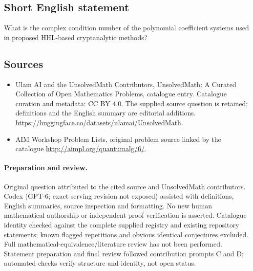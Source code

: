\documentclass[11pt]{article}
\begin{document}
\subsection{Short English statement}
What is the complex condition number of the polynomial coefficient systems used in proposed HHL-based cryptanalytic methods?
\subsection{Sources}
\begin{itemize}
\item[\hypertarget{source:statement:1}{S1}] Ulam AI and the UnsolvedMath Contributors, UnsolvedMath: A Curated Collection of Open Mathematics Problems, catalogue entry. Catalogue curation and metadata: CC BY 4.0. The supplied source question is retained; definitions and the English summary are editorial additions.
\url{https://huggingface.co/datasets/ulamai/UnsolvedMath}.
\item[\hypertarget{source:statement:2}{S2}] AIM Workshop Problem Lists, original problem source linked by the catalogue
\url{http://aimpl.org/quantumalg/6/}.
\end{itemize}
\paragraph{Preparation and review.}
Original question attributed to the cited source and UnsolvedMath contributors. Codex (GPT-6; exact serving revision not exposed) assisted with definitions, English summaries, source inspection and formatting. No new human mathematical authorship or independent proof verification is asserted. Catalogue identity checked against the complete supplied registry and existing repository statements; known flagged repetitions and obvious identical conjectures excluded. Full mathematical-equivalence/literature review has not been performed. Statement preparation and final review followed contribution prompts C and D; automated checks verify structure and identity, not open status.
\label{end:statement}
\end{document}
